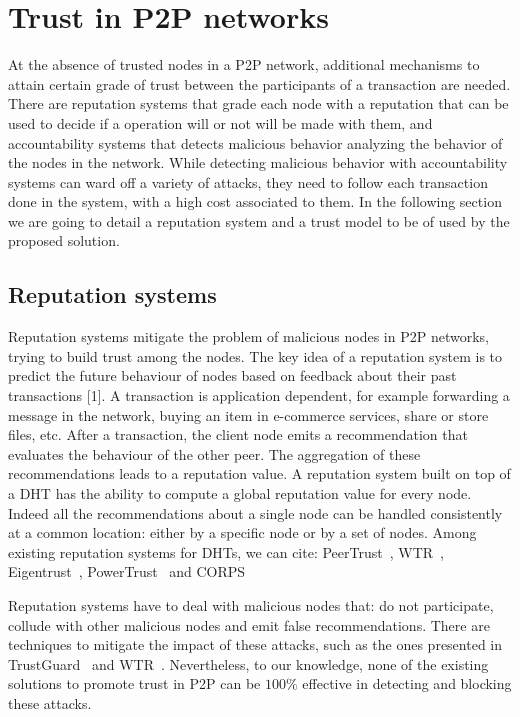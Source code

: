 \section{Trust in P2P networks}

At the absence of trusted nodes in a P2P network, additional mechanisms to
attain certain grade of trust between the participants of a transaction are
needed. There are reputation systems that grade each node with a reputation
that can be used to decide if a operation will or not will be made with them,
and accountability systems that detects malicious behavior analyzing the
behavior of the nodes in the network. While  detecting malicious behavior with
accountability systems can ward off a variety of attacks, they need to follow
each transaction done in the system, with a high cost associated to them.
 In the following section we are going to
detail a reputation system and a trust model to be of used by the proposed
solution.


\subsection{Reputation systems}
Reputation systems mitigate the problem of malicious nodes in
P2P networks, trying to build trust among the nodes. The key
idea of a reputation system is to predict the future behaviour
of nodes based on feedback about their past transactions [1]. A
transaction is application dependent, for example forwarding a
message in the network, buying an item in e-commerce services,
share or store files, etc. After a transaction, the client node emits
a recommendation that evaluates the behaviour of the other peer.
The aggregation of these recommendations leads to a reputation
value.
A reputation system built on top of a DHT has the ability
to compute a global reputation value for every node. Indeed
all the recommendations about a single node can be handled
consistently at a common location: either by a specific node
or by a set of nodes. Among existing reputation systems for
DHTs, we can cite: PeerTrust~\cite{peertrust}, WTR~\cite{wtr},
Eigentrust~\cite{eigentrust},
PowerTrust~\cite{powertrust} and CORPS~\cite{corps}

Reputation systems have to deal with malicious nodes that:
do not participate, collude with other malicious nodes and
emit false recommendations. There are techniques to mitigate
the impact of these attacks, such as the ones presented in
TrustGuard~\cite{trustguard} and WTR~\cite{wtr}. Nevertheless, to our knowledge,
none of the existing solutions to promote trust in P2P can be
$100\%$ effective in detecting and blocking these attacks.

